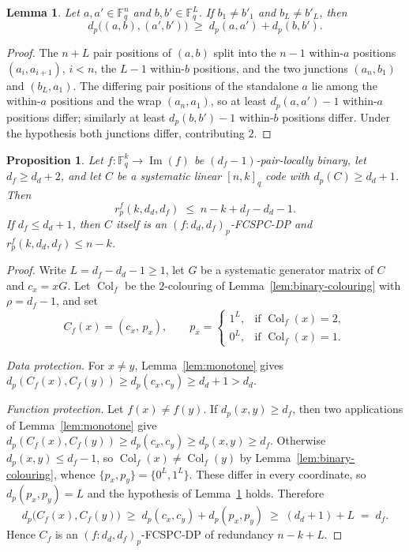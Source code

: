 \documentclass[11pt,draftclsnofoot,journal,onecolumn]{IEEEtran}
\newtheorem{lemma}{Lemma}
\newtheorem{proposition}{Proposition}
\begin{document}
    \begin{lemma}
    \label{lem:junction}
    Let $a,a' \in \mathbb{F}_q^{n}$ and $b,b' \in \mathbb{F}_q^{L}$. If $b_1 \neq b'_1$ and $b_L \neq b'_L$, then
    \[
    d_p\bigl((a,b),(a',b')\bigr) \;\ge\; d_p(a,a') + d_p(b,b') .
    \]
    \end{lemma}
    \begin{proof}
    The $n+L$ pair positions of $(a,b)$ split into the $n-1$ within-$a$ positions $(a_i,a_{i+1})$, $i < n$, the $L-1$ within-$b$ positions, and the two junctions $(a_n,b_1)$ and $(b_L,a_1)$. The differing pair positions of the standalone $a$ lie among the within-$a$ positions and the wrap $(a_n,a_1)$, so at least $d_p(a,a')-1$ within-$a$ positions differ; similarly at least $d_p(b,b')-1$ within-$b$ positions differ. Under the hypothesis both junctions differ, contributing $2$.
    \end{proof}


    \begin{proposition}
\label{lem:pair-locally-binary-fcspcdp}
Let $f : \mathbb{F}_q^k \to \operatorname{Im}(f)$ be $(d_f-1)$-pair-locally binary, let
$d_f \ge d_d + 2$, and let $C$ be a systematic linear $[n,k]_q$ code with
$d_p(C) \ge d_d + 1$. Then
\[
    r_p^f(k, d_d, d_f) \;\le\; n - k + d_f - d_d - 1 .
\]
If $d_f \le d_d + 1$, then $C$ itself is an $(f : d_d,d_f)_p$-FCSPC-DP and
$r_p^f(k,d_d,d_f) \le n-k$.
\end{proposition}
    \begin{proof}
Write $L = d_f - d_d - 1 \ge 1$, let $G$ be a systematic generator matrix of $C$ and
$c_x = xG$. Let $\operatorname{Col}_f$ be the $2$-colouring of
Lemma~\ref{lem:binary-colouring} with $\rho = d_f - 1$, and set
\[
    C_f(x) = (c_x,\, p_x), \qquad
    p_x = \begin{cases}
        1^{L}, & \text{if } \operatorname{Col}_f(x) = 2,\\
        0^{L}, & \text{if } \operatorname{Col}_f(x) = 1.
    \end{cases}
\]

\emph{Data protection.} For $x \neq y$, Lemma~\ref{lem:monotone} gives
$d_p(C_f(x),C_f(y)) \ge d_p(c_x,c_y) \ge d_d + 1 > d_d$.

\emph{Function protection.} Let $f(x) \neq f(y)$. If $d_p(x,y) \ge d_f$, then two
applications of Lemma~\ref{lem:monotone} give
$d_p(C_f(x),C_f(y)) \ge d_p(c_x,c_y) \ge d_p(x,y) \ge d_f$. Otherwise
$d_p(x,y) \le d_f-1$, so $\operatorname{Col}_f(x) \neq \operatorname{Col}_f(y)$ by
Lemma~\ref{lem:binary-colouring}, whence $\{p_x,p_y\} = \{0^L,1^L\}$. These differ in
every coordinate, so $d_p(p_x,p_y) = L$ and the hypothesis of
Lemma~\ref{lem:junction} holds. Therefore
\[
    d_p\bigl(C_f(x),C_f(y)\bigr) \;\ge\; d_p(c_x,c_y) + d_p(p_x,p_y)
    \;\ge\; (d_d + 1) + L \;=\; d_f .
\]
Hence $C_f$ is an $(f : d_d,d_f)_p$-FCSPC-DP of redundancy $n-k+L$.
\end{proof}
\end{document}

